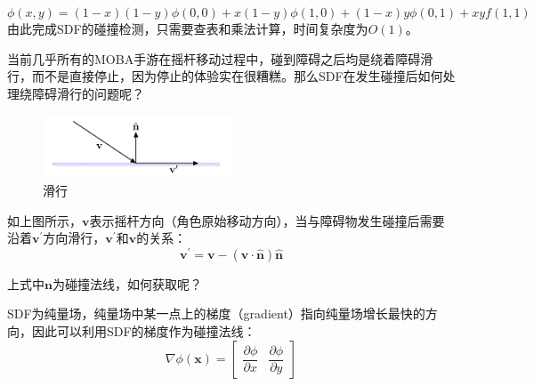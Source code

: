 \[
\phi(x, y)=(1-x)(1-y)\phi(0,0) + x(1-y)\phi(1,0)+(1-x)y\phi(0,1)+xyf(1,1)
\] 由此完成SDF的碰撞检测，只需要查表和乘法计算，时间复杂度为\(O(1)\)。

\begin{Shaded}
\begin{Highlighting}[]
  
    \NormalTok{);}
    \NormalTok{);}
\NormalTok{ - rx) + sdf[i         + }\NormalTok{] * rx) * (}
\NormalTok{ - rx) + sdf[i + width + }\NormalTok{] * rx) * ry;}
\NormalTok{\}}
\end{Highlighting}
\end{Shaded}

当前几乎所有的MOBA手游在摇杆移动过程中，碰到障碍之后均是绕着障碍滑行，而不是直接停止，因为停止的体验实在很糟糕。那么SDF在发生碰撞后如何处理绕障碍滑行的问题呢？

\begin{figure}
\centering
\includegraphics[width=0.5\textwidth,height=\textheight]{sliding.png}
\caption{滑行}
\end{figure}

如上图所示，\(\mathbf{v}\)表示摇杆方向（角色原始移动方向），当与障碍物发生碰撞后需要沿着\(\mathbf{v}^{\prime}\)方向滑行，\(\mathbf{ v}^{\prime}\)和\(\mathbf{v}\)的关系：
\[
\mathbf{v}^\prime=\mathbf{v}-(\mathbf{v}\cdot\hat{\mathbf{n}})\hat{\mathbf{n}}
\]

上式中\(\mathbf{n}\)为碰撞法线，如何获取呢？

SDF为纯量场，纯量场中某一点上的梯度（gradient）指向纯量场增长最快的方向，因此可以利用SDF的梯度作为碰撞法线：
\[
\nabla\phi(\mathbf{x})=\begin{bmatrix}\dfrac{\partial\phi}{\partial x}&\dfrac{\partial\phi}{\partial y}\end{bmatrix}
\]

